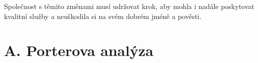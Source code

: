 
Společnost s těmito změnami musí udržovat krok, aby mohla i nadále poskytovat kvalitní služby a neuškodila si na svém dobrém jméně a pověsti.\\



\newpage

\section*{A. Porterova analýza}
\label{sec:Porterova analyza}

